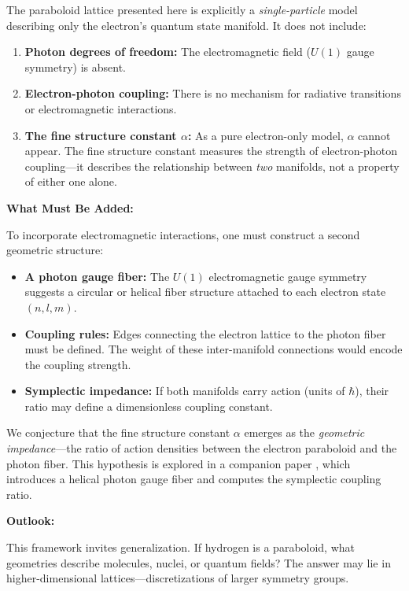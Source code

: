 \documentclass[aps,pra,twocolumn,superscriptaddress,longbibliography]{revtex4-2}
\begin{document}
The paraboloid lattice presented here is explicitly a \textit{single-particle} model describing only the electron's quantum state manifold. It does not include:
\begin{enumerate}
\item \textbf{Photon degrees of freedom:} The electromagnetic field ($U(1)$ gauge symmetry) is absent.
\item \textbf{Electron-photon coupling:} There is no mechanism for radiative transitions or electromagnetic interactions.
\item \textbf{The fine structure constant $\alpha$:} As a pure electron-only model, $\alpha$ cannot appear. The fine structure constant measures the strength of electron-photon coupling---it describes the relationship between \textit{two} manifolds, not a property of either one alone.
\end{enumerate}

\textbf{What Must Be Added:}

To incorporate electromagnetic interactions, one must construct a second geometric structure:
\begin{itemize}
\item \textbf{A photon gauge fiber:} The $U(1)$ electromagnetic gauge symmetry suggests a circular or helical fiber structure attached to each electron state $(n,l,m)$.
\item \textbf{Coupling rules:} Edges connecting the electron lattice to the photon fiber must be defined. The weight of these inter-manifold connections would encode the coupling strength.
\item \textbf{Symplectic impedance:} If both manifolds carry action (units of $\hbar$), their ratio may define a dimensionless coupling constant.
\end{itemize}

We conjecture that the fine structure constant $\alpha$ emerges as the \textit{geometric impedance}---the ratio of action densities between the electron paraboloid and the photon fiber. This hypothesis is explored in a companion paper \cite{companion_alpha}, which introduces a helical photon gauge fiber and computes the symplectic coupling ratio.

\textbf{Outlook:}

This framework invites generalization. If hydrogen is a paraboloid, what geometries describe molecules, nuclei, or quantum fields? The answer may lie in higher-dimensional lattices---discretizations of larger symmetry groups.
\end{document}

